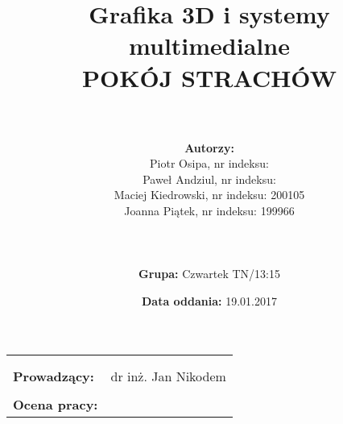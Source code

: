 \documentclass{article}
\title{Grafika 3D i systemy multimedialne\\
	\vspace{5mm}
	\textbf{POKÓJ STRACHÓW}}
\author{\\
	\\\textbf{Autorzy:}
	\\Piotr Osipa, nr indeksu:
	\\Paweł Andziul, nr indeksu: 
	\\Maciej Kiedrowski, nr indeksu: 200105
	\\Joanna Piątek, nr indeksu: 199966
	\\\\
	\\
	\\\textbf{Grupa:} Czwartek TN/13:15}
\date{\textbf{Data oddania:} 19.01.2017}
\begin{document}
\maketitle %

\begin{center}
\begin{tabular}{l r}
\\\\\\
\textbf{Prowadzący:} & dr inż. Jan Nikodem \\
\\\textbf{Ocena pracy:} &  %
\end{tabular}
\end{center}
 
\newpage
\tableofcontents 	%
\newpage







\end{document}
